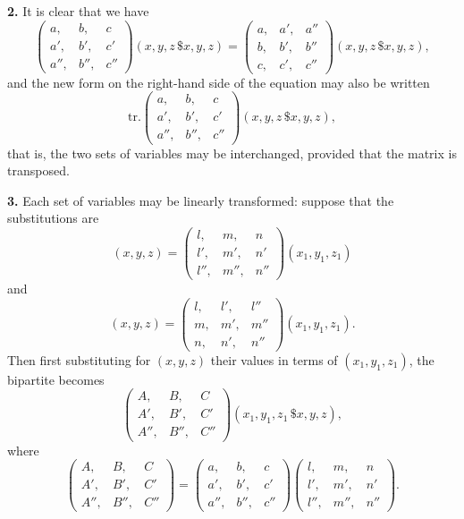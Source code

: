 \documentclass[11pt,a4paper]{book}
\begin{document}
\begin{center}
\medskip
\noindent\textbf{2.} It is clear that we have
\[
\begin{pmatrix} a, & b, & c \\ a', & b', & c' \\ a'', & b'', & c'' \end{pmatrix}(x,y,z\,\$x,y,z)
= \begin{pmatrix} a, & a', & a'' \\ b, & b', & b'' \\ c, & c', & c'' \end{pmatrix}(x,y,z\,\$x,y,z),
\]
and the new form on the right-hand side of the equation may also be written
\[\text{tr.}\begin{pmatrix} a, & b, & c \\ a', & b', & c' \\ a'', & b'', & c'' \end{pmatrix}(x,y,z\,\$x,y,z),\]
that is, the two sets of variables may be interchanged, provided that the matrix is transposed.

\medskip
\noindent\textbf{3.} Each set of variables may be linearly transformed: suppose that the substitutions are
\[
(x,y,z) = \begin{pmatrix} l, & m, & n \\ l', & m', & n' \\ l'', & m'', & n'' \end{pmatrix}(x_1,y_1,z_1)
\]
and
\[
(x,y,z) = \begin{pmatrix} l, & l', & l'' \\ m, & m', & m'' \\ n, & n', & n'' \end{pmatrix}(x_1,y_1,z_1).
\]
Then first substituting for $(x,y,z)$ their values in terms of $(x_1,y_1,z_1)$, the bipartite becomes
\[
\begin{pmatrix} A, & B, & C \\ A', & B', & C' \\ A'', & B'', & C'' \end{pmatrix}(x_1,y_1,z_1\,\$x,y,z),
\]
where
\[
\begin{pmatrix} A, & B, & C \\ A', & B', & C' \\ A'', & B'', & C'' \end{pmatrix}
= \begin{pmatrix} a, & b, & c \\ a', & b', & c' \\ a'', & b'', & c'' \end{pmatrix}
\begin{pmatrix} l, & m, & n \\ l', & m', & n' \\ l'', & m'', & n'' \end{pmatrix}.
\]


\end{center}
\end{document}
